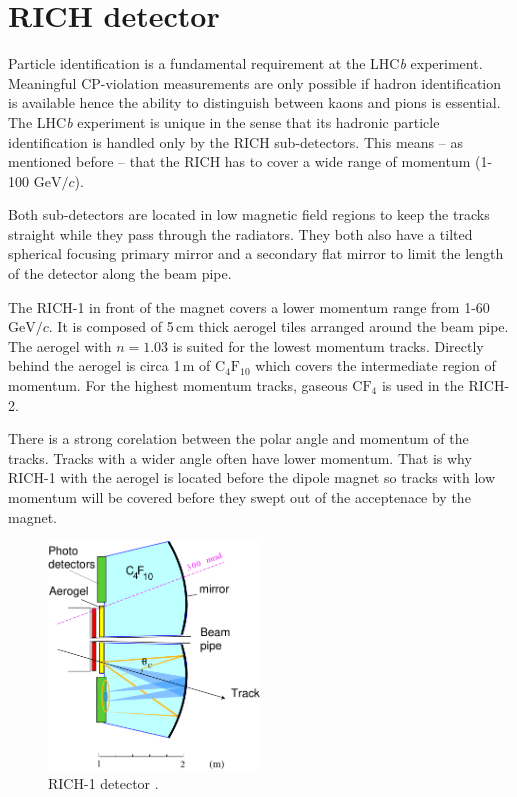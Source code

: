\documentclass[11pt,twoside]{scrreprt}
\begin{document}
\section{RICH detector} %
\label{sec:rich_detector}

Particle identification is a fundamental requirement at the LHC\textit{b} experiment. Meaningful CP-violation measurements are only possible if hadron identification is available hence the ability to distinguish between kaons and pions is  essential.
The LHC\textit{b} experiment is unique in the sense that its hadronic particle identification is handled only by the RICH sub-detectors. This means -- as mentioned before -- that the RICH has to cover a wide range of momentum (1-100 $\text{GeV}/c$).

Both sub-detectors are located in low magnetic field regions to keep the tracks straight while they pass through the radiators. They both 
also have a tilted spherical focusing primary mirror and a secondary flat mirror to limit the length of the detector along the beam pipe.

The RICH-1 in front of the magnet covers a lower momentum range from 1-60 $\text{GeV}/c$. It is composed of 5\,cm thick aerogel tiles arranged around the beam pipe. The aerogel with $n=1.03$ is suited for the lowest momentum tracks. Directly behind the aerogel is circa 1\,m of $\text{C}_4\text{F}_{10}$ which covers the intermediate region of momentum.
For the highest momentum tracks, gaseous $\text{C}\text{F}_4$ is used in the RICH-2.

There is a strong corelation between the polar angle and momentum of the tracks. Tracks with a wider angle often have lower momentum. That is why RICH-1 with the aerogel is located before the dipole magnet so tracks with low momentum will be covered before they swept out of the acceptenace by the magnet.

\begin{figure}[tb]
  \centering
  \includegraphics[width=0.5\textwidth]{pics/rich1_schematic}
  \caption{RICH-1 detector \cite{LHCb:2000}.}
  \label{fig:rich1}
\end{figure}
\end{document}
